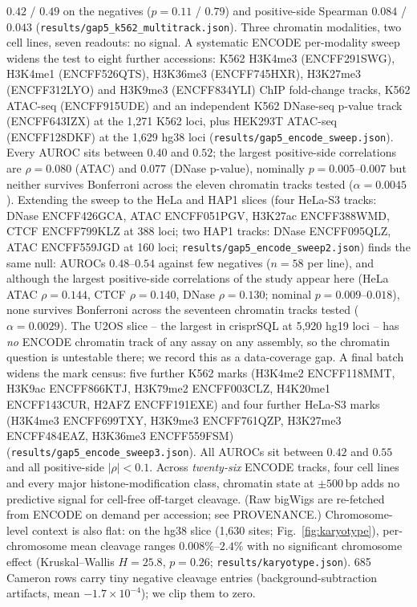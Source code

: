 \documentclass[12pt]{article}
\begin{document}
$0.42$ / $0.49$ on the negatives ($p=0.11$ / $0.79$) and positive-side
Spearman $0.084$ / $0.043$ (\texttt{results/gap5\_k562\_multitrack.json}).
Three chromatin modalities, two cell lines, seven readouts: no signal.
A systematic ENCODE per-modality sweep widens the test to eight further
accessions: K562 H3K4me3 (ENCFF291SWG), H3K4me1 (ENCFF526QTS),
H3K36me3 (ENCFF745HXR), H3K27me3 (ENCFF312LYO) and H3K9me3
(ENCFF834YLI) ChIP fold-change tracks, K562 ATAC-seq (ENCFF915UDE) and
an independent K562 DNase-seq p-value track (ENCFF643IZX) at the 1{,}271
K562 loci, plus HEK293T ATAC-seq (ENCFF128DKF) at the 1{,}629 hg38 loci
(\texttt{results/gap5\_encode\_sweep.json}). Every AUROC sits between
$0.40$ and $0.52$; the largest positive-side correlations are
${\rho}=0.080$ (ATAC) and $0.077$ (DNase p-value), nominally
$p=0.005$--$0.007$ but neither survives Bonferroni across the eleven
chromatin tracks tested ($\alpha=0.0045$). Extending the sweep to
the HeLa and HAP1 slices (four HeLa-S3 tracks: DNase ENCFF426GCA, ATAC
ENCFF051PGV, H3K27ac ENCFF388WMD, CTCF ENCFF799KLZ at 388 loci; two
HAP1 tracks: DNase ENCFF095QLZ, ATAC ENCFF559JGD at 160 loci;
\texttt{results/gap5\_encode\_sweep2.json}) finds the same null:
AUROCs $0.48$--$0.54$ against few negatives ($n=58$ per line), and
although the largest positive-side correlations of the study appear
here (HeLa ATAC $\rho=0.144$, CTCF $\rho=0.140$, DNase $\rho=0.130$;
nominal $p=0.009$--$0.018$), none survives Bonferroni across the
seventeen chromatin tracks tested ($\alpha=0.0029$). The U2OS slice --
the largest in crisprSQL at 5{,}920 hg19 loci -- has \emph{no} ENCODE
chromatin track of any assay on any assembly, so the chromatin question
is untestable there; we record this as a data-coverage gap. A final batch widens the
mark census: five further K562 marks (H3K4me2 ENCFF118MMT, H3K9ac
ENCFF866KTJ, H3K79me2 ENCFF003CLZ, H4K20me1 ENCFF143CUR, H2AFZ
ENCFF191EXE) and four further HeLa-S3 marks (H3K4me3 ENCFF699TXY,
H3K9me3 ENCFF761QZP, H3K27me3 ENCFF484EAZ, H3K36me3 ENCFF559FSM)
(\texttt{results/gap5\_encode\_sweep3.json}). All AUROCs sit between
$0.42$ and $0.55$ and all positive-side $|\rho| < 0.1$. Across
\emph{twenty-six} ENCODE tracks, four cell lines and every major
histone-modification class, chromatin state at $\pm 500$\,bp adds no
predictive signal for cell-free off-target cleavage. (Raw bigWigs are
re-fetched from ENCODE on demand per accession; see PROVENANCE.)
Chromosome-level context is also flat: on the hg38 slice (1{,}630
sites; Fig.~\ref{fig:karyotype}), per-chromosome mean cleavage ranges
$0.008\%$--$2.4\%$ with no significant chromosome effect (Kruskal--Wallis
$H=25.8$, $p=0.26$; \texttt{results/karyotype.json}). 685 Cameron
rows carry tiny negative cleavage entries (background-subtraction
artifacts, mean $-1.7\times10^{-4}$); we clip them to zero.
\end{document}
